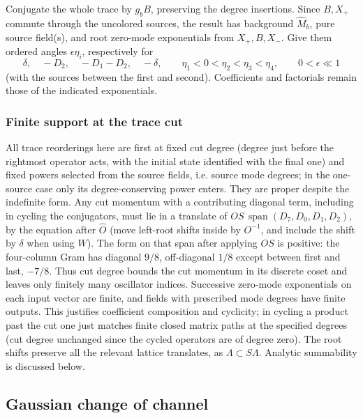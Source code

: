 \documentclass[11pt]{article}
\numberwithin{equation}{section}
\theoremstyle{definition}\newtheorem{definition}[theorem]{Definition}
\theoremstyle{remark}\newtheorem{remark}[theorem]{Remark}
\begin{document}
Conjugate the whole trace by \(g_b B\), preserving the degree insertions. Since \(B,X_+\) commute through the uncolored sources, the result has background \(\widehat M_b\), pure source field(s), and root zero-mode exponentials from \(X_+,B,X_-\). Give them ordered angles \(\epsilon\eta_i\), respectively for
\[
 \delta,\quad -D_2,\quad -D_1-D_2,\quad -\delta,\qquad
 \eta_1<0<\eta_2<\eta_3<\eta_4,\qquad 0<\epsilon\ll1
\]
(with the sources between the first and second). Coefficients and factorials remain those of the indicated exponentials.

\subsubsection*{Finite support at the trace cut}

All trace reorderings here are first at fixed cut degree (degree just before the rightmost operator acts, with the initial state identified with the final one) and fixed powers selected from the source fields, i.e. source mode degrees; in the one-source case only its degree-conserving power enters. They are proper despite the indefinite form. Any cut momentum with a contributing diagonal term, including in cycling the conjugators, must lie in a translate of \(OS\,\operatorname{span}(D_7,D_0,D_1,D_2)\), by the equation after \(\widehat O\) (move left-root shifts inside by \(O^{-1}\), and include the shift by \(\delta\) when using \(W\)). The form on that span after applying \(OS\) is positive: the four-column Gram has diagonal \(9/8\), off-diagonal \(1/8\) except between first and last, \(-7/8\). Thus cut degree bounds the cut momentum in its discrete coset and leaves only finitely many oscillator indices. Successive zero-mode exponentials on each input vector are finite, and fields with prescribed mode degrees have finite outputs. This justifies coefficient composition and cyclicity; in cycling a product past the cut one just matches finite closed matrix paths at the specified degrees (cut degree unchanged since the cycled operators are of degree zero). The root shifts preserve all the relevant lattice translates, as \(\Lambda\subset S\Lambda\). Analytic summability is discussed below.

\subsection{Gaussian change of channel}\label{L:step4}
\end{document}
